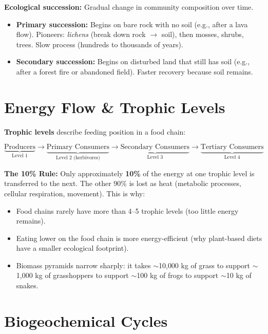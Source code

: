 \documentclass[11pt, letterpaper]{article}
\begin{document}
\textbf{Ecological succession:} Gradual change in community composition over time.
\begin{itemize}[noitemsep]
  \item \textbf{Primary succession:} Begins on bare rock with no soil (e.g., after a lava
        flow). Pioneers: \emph{lichens} (break down rock $\to$ soil), then mosses,
        shrubs, trees. Slow process (hundreds to thousands of years).
  \item \textbf{Secondary succession:} Begins on disturbed land that still has soil (e.g.,
        after a forest fire or abandoned field). Faster recovery because soil remains.
\end{itemize}

\section*{Energy Flow \& Trophic Levels}

\textbf{Trophic levels} describe feeding position in a food chain:

\[
  \underbrace{\text{Producers}}_{\text{Level 1}} \to
  \underbrace{\text{Primary Consumers}}_{\text{Level 2 (herbivores)}} \to
  \underbrace{\text{Secondary Consumers}}_{\text{Level 3}} \to
  \underbrace{\text{Tertiary Consumers}}_{\text{Level 4}}
\]

\begin{tcolorbox}[colback=partbg, colframe=sectionblue, arc=3pt, boxrule=1pt]
\textbf{The 10\% Rule:} Only approximately \textbf{10\%} of the energy at one trophic level
is transferred to the next. The other 90\% is lost as heat (metabolic processes, cellular
respiration, movement). This is why:
\begin{itemize}[noitemsep, leftmargin=*]
  \item Food chains rarely have more than 4--5 trophic levels (too little energy remains).
  \item Eating lower on the food chain is more energy-efficient (why plant-based diets have
        a smaller ecological footprint).
  \item Biomass pyramids narrow sharply: it takes $\sim$10{,}000 kg of grass to support
        $\sim$1{,}000 kg of grasshoppers to support $\sim$100 kg of frogs to support
        $\sim$10 kg of snakes.
\end{itemize}
\end{tcolorbox}

\section*{Biogeochemical Cycles}
\end{document}
